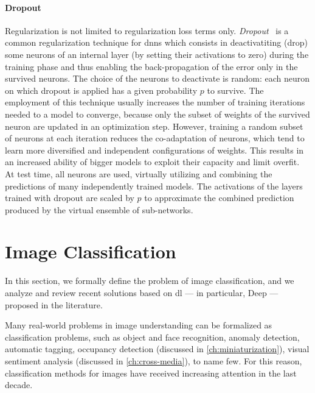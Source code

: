 \paragraph{Dropout}
Regularization is not limited to regularization loss terms only.
\emph{Dropout}~\cite{hinton2012improving} is a common regularization technique for \glspl{dnn} which consists in deactivatiting (drop) some neurons of an internal layer (by setting their activations to zero) during the training phase and thus enabling the back-propagation of the error only in the survived neurons.
The choice of the neurons to deactivate is random: each neuron on which dropout is applied has a given probability $p$ to survive.
The employment of this technique usually increases the number of training iterations needed to a model to converge, because only the subset of weights of the survived neuron are updated in an optimization step.
However, training a random subset of neurons at each iteration reduces the co-adaptation of neurons, which tend to learn more diversified and independent configurations of weights.
This results in an increased ability of bigger models to exploit their capacity and limit overfit.
At test time, all neurons are used, virtually utilizing and combining the predictions of many independently trained models.
The activations of the layers trained with dropout are scaled by $p$ to approximate the combined prediction produced by the virtual ensemble of sub-networks.


\section{Image Classification}
\label{sec:back:image-classification}

In this section, we formally define the problem of image classification, and we analyze and review recent solutions based on \acrlong{dl} --- in particular, Deep  --- proposed in the literature.

Many real-world problems in image understanding can be formalized as classification problems, such as object and face recognition, anomaly detection, automatic tagging, occupancy detection (discussed in \ref{ch:miniaturization}), visual sentiment analysis (discussed in \ref{ch:cross-media}), to name few.
For this reason, classification methods for images have received increasing attention in the last decade.

